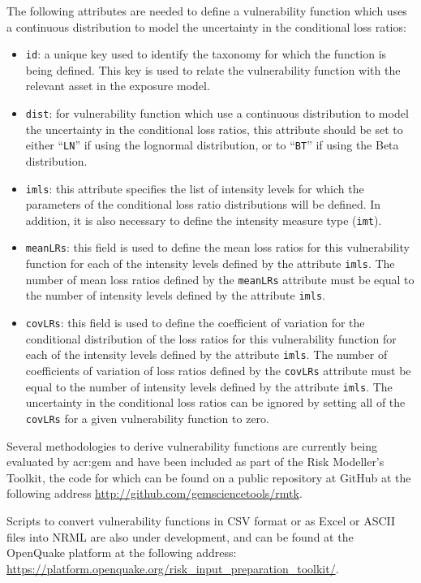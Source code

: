 The following attributes are needed to define a vulnerability function which
uses a continuous distribution to model the uncertainty in the conditional
loss ratios:

\begin{itemize}

    \item \Verb+id+: a unique key used to identify the \gls{taxonomy} for 
    which the function is being defined. This key is used to relate the 
    \gls{vulnerability function} with the relevant \gls{asset} in the 
    \gls{exposure model}.

    \item \Verb+dist+: for vulnerability function which use a continuous 
    distribution to model the uncertainty in the conditional loss ratios, 
    this attribute should be set to either ``\Verb+LN+'' if using the lognormal
    distribution, or to ``\Verb+BT+'' if using the Beta distribution.

    \item \Verb+imls+: this attribute specifies the list of intensity levels
    for which the parameters of the conditional loss ratio distributions will
    be defined. In addition, it is also necessary to define the intensity 
    measure type (\Verb+imt+).

    \item \Verb+meanLRs+: this field is used to define the mean loss ratios
    for this \gls{vulnerability function} for each of the intensity levels
    defined by the attribute \Verb+imls+. The number of mean loss ratios
    defined by the \Verb+meanLRs+ attribute must be equal to the number of
    intensity levels defined by the attribute \Verb+imls+.

    \item \Verb+covLRs+: this field is used to define the coefficient of 
    variation for the conditional distribution of the loss ratios for this
    \gls{vulnerability function} for each of the intensity levels defined by
    the attribute \Verb+imls+. The number of coefficients of variation of loss
    ratios defined by the \Verb+covLRs+ attribute must be equal to the number
    of intensity levels defined by the attribute \Verb+imls+. The uncertainty
    in the conditional loss ratios can be ignored by setting all of the
    \Verb+covLRs+ for a given \gls{vulnerability function} to zero.

\end{itemize}

Several methodologies to derive vulnerability functions are currently being
evaluated by \gls{acr:gem} and have been included as part of the Risk
Modeller's Toolkit, the code for which can be found on a public repository at
GitHub at the following address
\href{http://github.com/gemsciencetools/rmtk}{http://github.com/gemsciencetools/rmtk}.

Scripts to convert \glspl{vulnerability function} in CSV format or as Excel or
ASCII files into NRML are also under development, and can be found at the
OpenQuake platform at the following address:
\href{https://platform.openquake.org/risk_input_preparation_toolkit/}{https://platform.openquake.org/risk\_input\_preparation\_toolkit/}.

